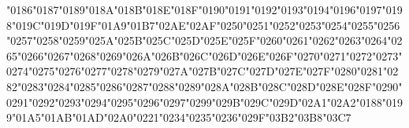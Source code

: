 {\LibertinusSerifPatch
	\char"0186\gs \char"0187\gs \char"0189\gs \char"018A\gs \char"018B\gs \char"018E\gs \char"018F\gs \char"0190\gs \char"0191\gs \char"0192\gs \char"0193\gs \char"0194\gs \char"0196\gs \char"0197\gs \char"0198\gs \char"019C\gs \char"019D\gs \char"019F\gs \char"01A9\gs \char"01B7\gs \char"02AE\gs \char"02AF\gs \char"0250\gs \char"0251\gs \char"0252\gs \char"0253\gs \char"0254\gs \char"0255\gs \char"0256\gs \char"0257\gs \char"0258\gs \char"0259\gs \char"025A\gs \char"025B\gs \char"025C\gs \char"025D\gs \char"025E\gs \char"025F\gs \char"0260\gs \char"0261\gs \char"0262\gs \char"0263\gs \char"0264\gs \char"0265\gs \char"0266\gs \char"0267\gs \char"0268\gs \char"0269\gs \char"026A\gs \char"026B\gs \char"026C\gs \char"026D\gs \char"026E\gs \char"026F\gs \char"0270\gs \char"0271\gs \char"0272\gs \char"0273\gs \char"0274\gs \char"0275\gs \char"0276\gs \char"0277\gs \char"0278\gs \char"0279\gs \char"027A\gs \char"027B\gs \char"027C\gs \char"027D\gs \char"027E\gs \char"027F\gs \char"0280\gs \char"0281\gs \char"0282\gs \char"0283\gs \char"0284\gs \char"0285\gs \char"0286\gs \char"0287\gs \char"0288\gs \char"0289\gs \char"028A\gs \char"028B\gs \char"028C\gs \char"028D\gs \char"028E\gs \char"028F\gs \char"0290\gs \char"0291\gs \char"0292\gs \char"0293\gs \char"0294\gs \char"0295\gs \char"0296\gs \char"0297\gs \char"0299\gs \char"029B\gs \char"029C\gs \char"029D\gs \char"02A1\gs \char"02A2\gs \char"0188\gs \char"0199\gs \char"01A5\gs \char"01AB\gs \char"01AD\gs \char"02A0\gs \char"0221\gs \char"0234\gs \char"0235\gs \char"0236\gs \char"029F\gs \char"03B2\gs \char"03B8\gs \char"03C7\gs
}

